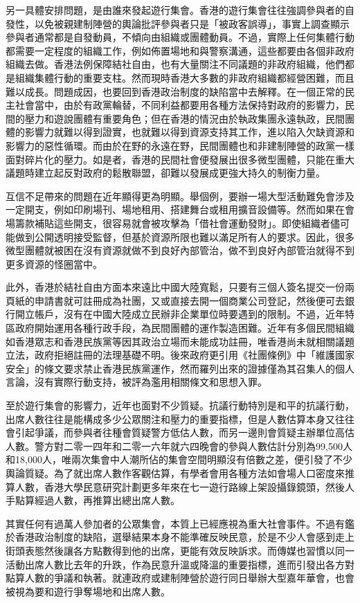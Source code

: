 另一具體安排問題，是由誰來發起遊行集會。香港的遊行集會往往強調參與者的自發性，以免被親建制陣營的輿論批評參與者只是「被政客誤導」，事實上調查顯示參與者通常都是自發動員，不傾向由組織或團體動員。不過，實際上任何集體行動都需要一定程度的組織工作，例如佈置場地和與警察溝通，這些都要由各個非政府組織去做。香港法例保障結社自由，也有大量關注不同議題的非政府組織，他們都是組織集體行動的重要支柱。然而現時香港大多數的非政府組織都經營困難，而且難以成長。問題成因，也要回到香港政治制度的缺陷當中去解釋。在一個正常的民主社會當中，由於有政黨輪替，不同利益都要用各種方法保持對政府的影響力，民間的壓力和遊說團體有重要角色；但在香港的情況由於執政集團永遠執政，民間團體的影響力就難以得到證實，也就難以得到資源支持其工作，進以陷入欠缺資源和影響力的惡性循環。而由於在野的永遠在野，民間團體也和非建制陣營的政黨一樣面對碎片化的壓力。如是者，香港的民間社會便發展出很多微型團體，只能在重大議題時建立起反對政府的鬆散聯盟，卻難以發展成更強大持久的制衡力量。

互信不足帶來的問題在近年顯得更為明顯。舉個例，要辦一場大型活動難免會涉及一定開支，例如印刷場刊、場地租用、搭建舞台或租用擴音設備等。然而如果在會場籌款補貼這些開支，很容易就會被攻擊為「借社會運動發財」。即使組織者儘可能做到公開透明接受監督，但基於資源所限也難以滿足所有人的要求。因此，很多微型團體就被困在沒有資源就做不到良好內部管治，做不到良好內部管治就得不到更多資源的怪圈當中。

此外，香港於結社自由方面本來遠比中國大陸寬鬆，只要有三個人簽名提交一份兩頁紙的申請書就可註冊成為社團，又或直接去開一個商業公司登記，然後便可去銀行開立帳戶，沒有在中國大陸成立民辦非企業單位時要遇到的限制。不過，近年特區政府開始運用各種行政手段，為民間團體的運作製造困難。近年有多個民間組織如香港眾志和香港民族黨等因其政治立場而未能成功註冊，唯香港尚未就相關議題立法，政府拒絕註冊的法理基礎不明。後來政府更引用《社團條例》中「維護國家安全」的條文要求禁止香港民族黨運作，然而羅列出來的證據僅為其召集人的個人言論，沒有實際行動支持，被評為濫用相關條文和思想入罪。

至於遊行集會的影響力，近年也面對不少質疑。抗議行動特別是和平的抗議行動，出席人數往往是能構成多少公眾關注和壓力的重要指標，但是人數估算本身又往往會引起爭議，而參與者往種會質疑警方低估人數，而另一邊則會質疑主辦單位高估人數。警方對二零一四年和二零一六年就六四晚會的參與人數估計分別為99,500人和18,000人，唯兩次集會中人潮所佔的集會空間明顯沒有倍數之差，便引發了不少輿論質疑。為了就出席人數作客觀估算，有學者會用各種方法如會場人口密度來推算人數，香港大學民意研究計劃更多年來在七一遊行路線上架設攝錄鏡頭，然後人手點算經過人數，再推算出總出席人數。

其實任何有過萬人參加者的公眾集會，本質上已經應視為重大社會事件。不過有鑑於香港政治制度的缺陷，選舉結果本身不能準確反映民意，於是不少人會感到走上街頭表態然後讓各方點數得到他的出席，更能有效反映訴求。而傳媒也習慣以同一活動出席人數比去年的升跌，作為民意升溫或降溫的重要指標，進而引發出各方對點算人數的爭議和執著。就連政府或建制陣營於遊行同日舉辦大型嘉年華會，也會被視為要和遊行爭奪場地和出席人數。

